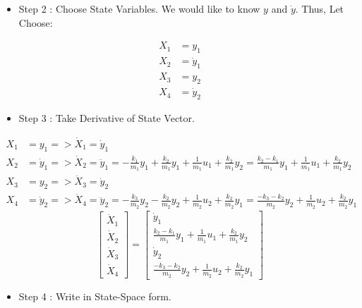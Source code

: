 \documentclass[12pt,a4paper]{article}
\begin{document}
	\begin{itemize}
		\item Step 2 : Choose State Variables. We would like to know \(y\) and \(\dot{y}\). Thus, Let Choose:
	\end{itemize}
	\[
	\begin{split}
		X_1 &= y_1 \\
		X_2 &= \dot{y}_1 \\
		X_3 &= y_2 \\
		X_4 &= \dot{y}_2
	\end{split}
	\]
	\begin{itemize}
		\item Step 3 : Take Derivative of State Vector.
	\end{itemize}
	\[
	\begin{split}
		X_1 &= y_1 => \dot{X}_1 = \dot{y}_1 \\
		X_2 &= \dot{y}_1 => \dot{X}_2 = \ddot{y}_1 = -\frac{k_1}{m_1}y_1 + \frac{k_2}{m_1}y_1 + \frac{1}{m_1}u_1 + \frac{k_2}{m_1}y_2 = \frac{k_2 - k_1}{m_1}y_1 + \frac{1}{m_1}u_1 + \frac{k_2}{m_1}y_2 \\
		X_3 &= y_2 => \dot{X}_3 = \dot{y}_2 \\ 
		X_4 &= \dot{y}_2 => \dot{X}_4 = \ddot{y}_2 = -\frac{k_3}{m_2}y_2 - \frac{k_2}{m_2}y_2 + \frac{1}{m_2}u_2 + \frac{k_2}{m_2}y_1 = \frac{-k_3 - k_2}{m_2}y_2 + \frac{1}{m_2}u_2 + \frac{k_2}{m_2}y_1
	\end{split}
	\]
	\[
	\begin{bmatrix}
		\dot{X}_1 \\
		\dot{X}_2 \\
		\dot{X}_3 \\
		\dot{X}_4 
	\end{bmatrix} =
	\begin{bmatrix}
		\dot{y}_1                                                         \\
		\frac{k_2 - k_1}{m_1}y_1 + \frac{1}{m_1}u_1 + \frac{k_2}{m_1}y_2  \\
		\dot{y}_2                                                         \\
		\frac{-k_3 - k_2}{m_2}y_2 + \frac{1}{m_2}u_2 + \frac{k_2}{m_2}y_1 
	\end{bmatrix}
	\]
	\begin{itemize}
		\item Step 4 : Write in State-Space form.
	\end{itemize}
\end{document}
